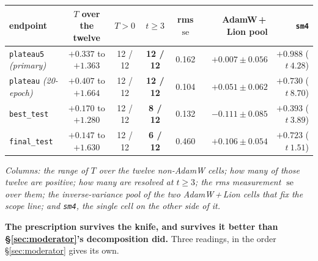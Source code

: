 \documentclass[10pt,letterpaper]{article}
\newcommand{\Tstat}{T}                         %
\newcommand{\plateau}{\texttt{plateau5}}
\newcommand{\arm}[1]{\texttt{#1}}
\DeclareMathOperator{\se}{se}
\begin{document}
\begin{center}
\footnotesize
\begin{tabular}{@{}lccccrr@{}}
\toprule
endpoint & $\Tstat$ over the twelve & $\Tstat > 0$ & $t \ge 3$ & rms $\se$ &
  AdamW\,+\,Lion pool & \arm{sm4} \\
\midrule
\plateau{} \emph{(primary)}        & $+0.337$ to $+1.363$ & 12 / 12 & \textbf{12 / 12} & 0.162 & $+0.007 \pm 0.056$ & $+0.988$ ($t\ 4.28$) \\
\texttt{plateau} \emph{(20-epoch)} & $+0.407$ to $+1.664$ & 12 / 12 & \textbf{12 / 12} & 0.104 & $+0.051 \pm 0.062$ & $+0.730$ ($t\ 8.70$) \\
\texttt{best\_test}                & $+0.170$ to $+1.280$ & 12 / 12 & \textbf{8 / 12}  & 0.132 & $-0.111 \pm 0.085$ & $+0.393$ ($t\ 3.89$) \\
\texttt{final\_test}               & $+0.147$ to $+1.630$ & 12 / 12 & \textbf{6 / 12}  & 0.460 & $+0.106 \pm 0.054$ & $+0.723$ ($t\ \mathbf{1.51}$) \\
\bottomrule
\end{tabular}
\end{center}
\noindent\emph{Columns: the range of $\Tstat$ over the twelve non-AdamW cells; how many of those
twelve are positive; how many are resolved at $t \ge 3$; the rms measurement $\se$ over them; the
inverse-variance pool of the two AdamW\,+\,Lion cells that fix the scope line; and \arm{sm4}, the
single cell on the other side of it.}

\textbf{The prescription survives the knife, and survives it better than
\S\ref{sec:moderator}'s decomposition did.} Three readings, in the order
\S\ref{sec:moderator} gives its own.
\end{document}
